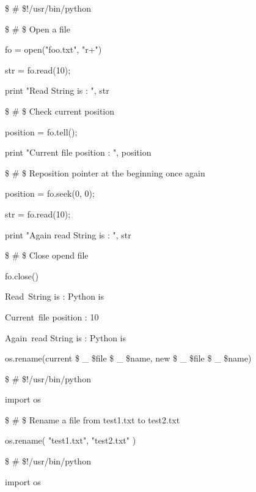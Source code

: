 \vspace{12pt}
\noindent 
 \$  \#  \$!/usr/bin/python \par
\vspace{12pt}
\noindent 
 \$  \#  \$ Open a file \par
\noindent 
fo = open("foo.txt", "r+") \par
\noindent 
str = fo.read(10); \par
\noindent 
print "Read String is : ", str \par
\vspace{12pt}
\noindent 
 \$  \#  \$ Check current position \par
\noindent 
position = fo.tell(); \par
\noindent 
print "Current file position : ", position \par
\vspace{12pt}
\noindent 
 \$  \#  \$ Reposition pointer at the beginning once again \par
\noindent 
position = fo.seek(0, 0); \par
\noindent 
str = fo.read(10); \par
\noindent 
print "Again read String is : ", str \par
\noindent 
 \$  \#  \$ Close opend file \par
\noindent 
fo.close() \par
\vspace{12pt}
\noindent 
Read~String is :  Python is \par
\noindent 
Current~file position :  10 \par
\noindent 
Again~read String is :  Python is \par
\vspace{12pt}
\noindent 
os.rename(current \$  \_  \$file \$  \_  \$name, new \$  \_  \$file \$  \_  \$name) \par
\vspace{12pt}
\noindent 
 \$  \#  \$!/usr/bin/python \par
\noindent 
import os \par
\vspace{12pt}
\noindent 
 \$  \#  \$ Rename a file from test1.txt to test2.txt \par
\noindent 
os.rename( "test1.txt", "test2.txt" ) \par
\vspace{12pt}
\noindent 
 \$  \#  \$!/usr/bin/python \par
\noindent 
import os \par
\vspace{12pt}
